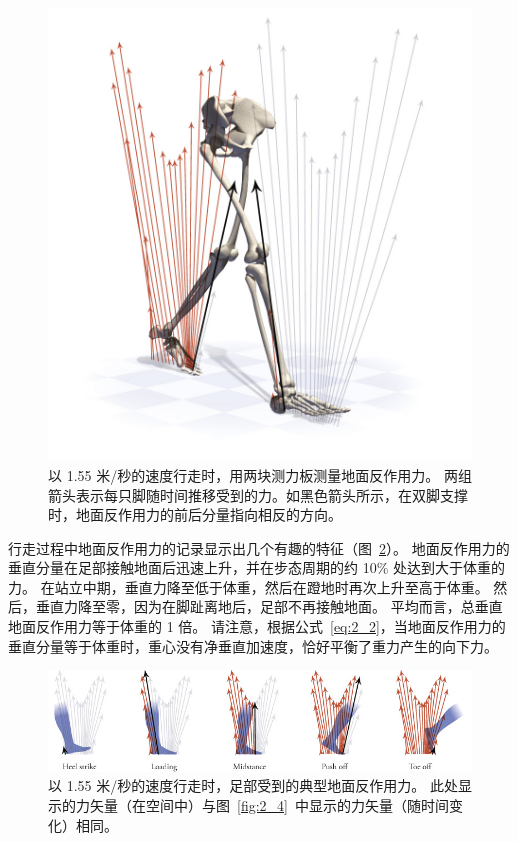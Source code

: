 \begin{figure}[!htb]
	\centering
	\includegraphics[width=0.9\linewidth]{chap2/2_5}
	\caption{以 1.55 米/秒的速度行走时，用两块测力板测量地面反作用力。
		两组箭头表示每只脚随时间推移受到的力。​​
		如黑色箭头所示，在双脚支撑时，地面反作用力的前后分量指向相反的方向。 \label{fig:2_5}}
\end{figure}


行走过程中地面反作用力的记录显示出几个有趣的特征（图~\ref{fig:2_6}）。
地面反作用力的垂直分量在足部接触地面后迅速上升，并在步态周期的约 10\% 处达到大于体重的力。
在站立中期，垂直力降至低于体重，然后在蹬地时再次上升至高于体重。
然后，垂直力降至零，因为在脚趾离地后，足部不再接触地面。
平均而言，总垂直地面反作用力等于体重的 1 倍。
请注意，根据公式~\ref{eq:2_2}，当地面反作用力的垂直分量等于体重时，重心没有净垂直加速度，恰好平衡了重力产生的向下力。

\begin{figure}[!htb]
	\centering
	\includegraphics[width=1.0\linewidth]{chap2/2_6}
	\caption{以 1.55 米/秒的速度行走时，足部受到的典型地面反作用力。
		此处显示的力矢量（在空间中）与图~\ref{fig:2_4}~中显示的力矢量（随时间变化）相同。 \label{fig:2_6}}
\end{figure}


